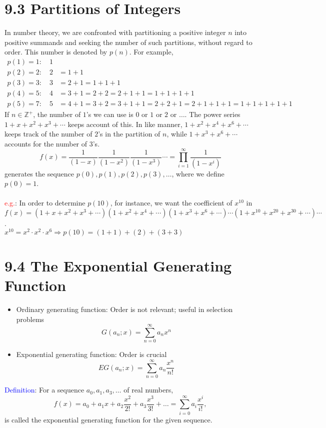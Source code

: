 \documentclass[a4paper]{article}
\begin{document}
\section*{9.3 Partitions of Integers}
In number theory, we are confronted with partitioning a positive integer $n$ into positive summands and seeking the number of such partitions, without regard to order. This number is denoted by $p(n)$. For example,
\begin{align*}
p(1) = 1:\quad 1&\\
p(2) = 2:\quad 2& = 1+1\\
p(3) = 3:\quad 3& = 2+1 = 1+1+1\\
p(4) = 5:\quad 4&=3+1=2+2=2+1+1=1+1+1+1\\
p(5) = 7:\quad 5&=4+1=3+2=3+1+1=2+2+1=2+1+1+1=1+1+1+1+1
\end{align*}
If $n\in \mathbb{Z}^+$, the number of $1$'s we can use is $0$ or $1$ or $2$ or $\dots$. The power series $1+x+x^2+x^3+\cdots$ keeps account of this. In like manner, $1+x^2+x^4+x^6+\cdots$ keeps track of the number of $2$'s in the partition of $n$, while $1+x^3+x^6+\cdots$ accounts for the number of $3$'s.
$$f(x)=\frac{1}{(1-x)}\frac{1}{(1-x^2)}\frac{1}{(1-x^3)}\cdots=\prod_{i=1}^{\infty}{\frac{1}{(1-x^i)}}$$ generates the sequence $p(0),p(1),p(2),p(3),\ldots$, where we define $p(0)=1$.\\
\\
\textcolor{red}{e.g.}: In order to determine $p(10)$, for instance, we want the coefficient of $x^{10}$ in $f(x)=(1+x+x^2+x^3+\cdots)(1+x^2+x^4+\cdots)(1+x^3+x^6+\cdots)\cdots(1+x^{10}+x^{20}+x^{30}+\cdots)\cdots$.\\
$x^{10}=x^2\cdot x^2\cdot x^6\Rightarrow p(10)=(1+1)+(2)+(3+3)$

\section*{9.4 The Exponential Generating Function}
\begin{itemize}
    \item Ordinary generating function: Order is not relevant; useful in selection problems
    $$G(a_n;x)=\sum_{n=0}^{\infty}{a_nx^n}$$
    \item Exponential generating function: Order is crucial
    $$EG(a_n;x)=\sum_{n=0}^{\infty}{a_n\frac{x^n}{n!}}$$
\end{itemize}
\textcolor{blue}{Definition}: For a sequence $a_0, a_1, a_3, \dots$ of real numbers, $$f(x)=a_0+a_1x+a_2\frac{x^2}{2!}+a_3\frac{x^3}{3!}+\dots=\sum_{i=0}^{\infty}{a_i\frac{x^i}{i!}},$$ 
is called the exponential generating function for the given sequence.
\end{document}
